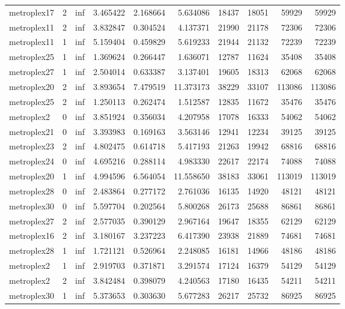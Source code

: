 \begin{longtable}{|l|r|r|r|r|r|r|r|r|r|}
metroplex17 & 2 & inf & 3.465422 & 2.168664 & 5.634086 & 18437 & 18051 & 59929 & 59929 \\
metroplex11 & 2 & inf & 3.832847 & 0.304524 & 4.137371 & 21990 & 21178 & 72306 & 72306 \\
metroplex11 & 1 & inf & 5.159404 & 0.459829 & 5.619233 & 21944 & 21132 & 72239 & 72239 \\
metroplex25 & 1 & inf & 1.369624 & 0.266447 & 1.636071 & 12787 & 11624 & 35408 & 35408 \\
metroplex27 & 1 & inf & 2.504014 & 0.633387 & 3.137401 & 19605 & 18313 & 62068 & 62068 \\
metroplex20 & 2 & inf & 3.893654 & 7.479519 & 11.373173 & 38229 & 33107 & 113086 & 113086 \\
metroplex25 & 2 & inf & 1.250113 & 0.262474 & 1.512587 & 12835 & 11672 & 35476 & 35476 \\
metroplex2 & 0 & inf & 3.851924 & 0.356034 & 4.207958 & 17078 & 16333 & 54062 & 54062 \\
metroplex21 & 0 & inf & 3.393983 & 0.169163 & 3.563146 & 12941 & 12234 & 39125 & 39125 \\
metroplex23 & 2 & inf & 4.802475 & 0.614718 & 5.417193 & 21263 & 19942 & 68816 & 68816 \\
metroplex24 & 0 & inf & 4.695216 & 0.288114 & 4.983330 & 22617 & 22174 & 74088 & 74088 \\
metroplex20 & 1 & inf & 4.994596 & 6.564054 & 11.558650 & 38183 & 33061 & 113019 & 113019 \\
metroplex28 & 0 & inf & 2.483864 & 0.277172 & 2.761036 & 16135 & 14920 & 48121 & 48121 \\
metroplex30 & 0 & inf & 5.597704 & 0.202564 & 5.800268 & 26173 & 25688 & 86861 & 86861 \\
metroplex27 & 2 & inf & 2.577035 & 0.390129 & 2.967164 & 19647 & 18355 & 62129 & 62129 \\
metroplex16 & 2 & inf & 3.180167 & 3.237223 & 6.417390 & 23938 & 21889 & 74681 & 74681 \\
metroplex28 & 1 & inf & 1.721121 & 0.526964 & 2.248085 & 16181 & 14966 & 48186 & 48186 \\
metroplex2 & 1 & inf & 2.919703 & 0.371871 & 3.291574 & 17124 & 16379 & 54129 & 54129 \\
metroplex2 & 2 & inf & 3.842484 & 0.398079 & 4.240563 & 17180 & 16435 & 54211 & 54211 \\
metroplex30 & 1 & inf & 5.373653 & 0.303630 & 5.677283 & 26217 & 25732 & 86925 & 86925 \\

\end{longtable}
